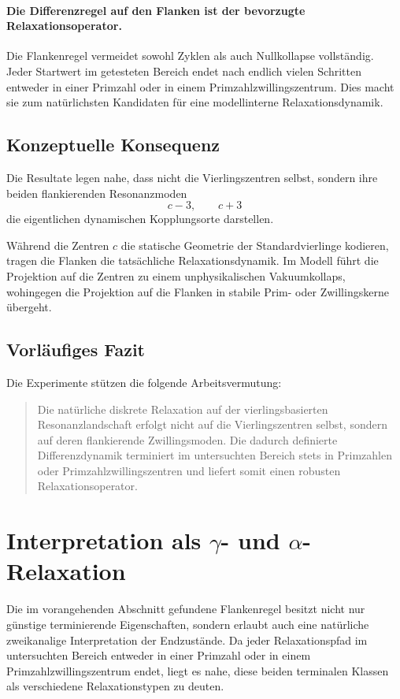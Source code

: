 \documentclass[11pt,a4paper]{article}
\theoremstyle{definition}
\theoremstyle{plain}
\theoremstyle{remark}
\begin{document}
	\paragraph{Die Differenzregel auf den Flanken ist der bevorzugte Relaxationsoperator.}
	Die Flankenregel vermeidet sowohl Zyklen als auch Nullkollapse vollständig. 
	Jeder Startwert im getesteten Bereich endet nach endlich vielen Schritten entweder in einer Primzahl oder in einem Primzahlzwillingszentrum. 
	Dies macht sie zum natürlichsten Kandidaten für eine modellinterne Relaxationsdynamik.
	
	\subsection{Konzeptuelle Konsequenz}
	
	Die Resultate legen nahe, dass nicht die Vierlingszentren selbst, sondern ihre beiden flankierenden Resonanzmoden
	\[
	c-3,\qquad c+3
	\]
	die eigentlichen dynamischen Kopplungsorte darstellen.
	
	Während die Zentren \(c\) die statische Geometrie der Standardvierlinge kodieren, tragen die Flanken die tatsächliche Relaxationsdynamik. 
	Im Modell führt die Projektion auf die Zentren zu einem unphysikalischen Vakuumkollaps, wohingegen die Projektion auf die Flanken in stabile Prim- oder Zwillingskerne übergeht.
	
	\subsection{Vorläufiges Fazit}
	
	Die Experimente stützen die folgende Arbeitsvermutung:
	
	\begin{quote}
		Die natürliche diskrete Relaxation auf der vierlingsbasierten Resonanzlandschaft erfolgt nicht auf die Vierlingszentren selbst, sondern auf deren flankierende Zwillingsmoden. 
		Die dadurch definierte Differenzdynamik terminiert im untersuchten Bereich stets in Primzahlen oder Primzahlzwillingszentren und liefert somit einen robusten Relaxationsoperator.
	\end{quote}
	\section{Interpretation als \texorpdfstring{$\gamma$}{gamma}- und \texorpdfstring{$\alpha$}{alpha}-Relaxation}
	
	Die im vorangehenden Abschnitt gefundene Flankenregel besitzt nicht nur günstige terminierende Eigenschaften, sondern erlaubt auch eine natürliche zweikanalige Interpretation der Endzustände. 
	Da jeder Relaxationspfad im untersuchten Bereich entweder in einer Primzahl oder in einem Primzahlzwillingszentrum endet, liegt es nahe, diese beiden terminalen Klassen als verschiedene Relaxationstypen zu deuten.
	
\end{document}
